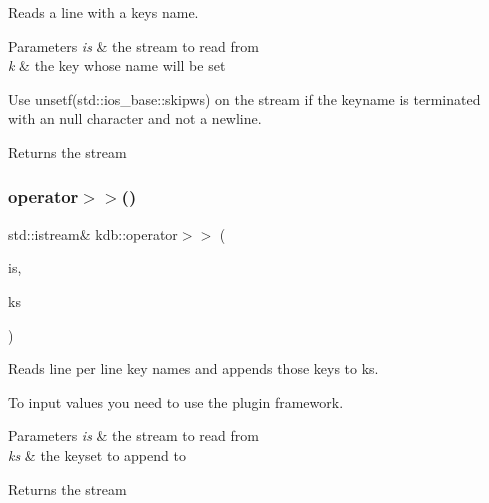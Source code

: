 Reads a line with a keys name. 


\begin{DoxyParams}{Parameters}
{\em is} & the stream to read from \\
\hline
{\em k} & the key whose name will be set\\
\hline
\end{DoxyParams}
Use unsetf(std\+::ios\+\_\+base\+::skipws) on the stream if the keyname is terminated with an null character and not a newline.

\begin{DoxyReturn}{Returns}
the stream 
\end{DoxyReturn}
\mbox{\label{namespacekdb_ac4479a9f39ed65ffd251161bcaf8ea89}} 
\subsubsection{\texorpdfstring{operator$>$$>$()}{operator>>()}\hspace{0.1cm}{\footnotesize\ttfamily [2/2]}}
{\footnotesize\ttfamily std\+::istream\& kdb\+::operator$>$$>$ (\begin{DoxyParamCaption}\item[{std\+::istream \&}]{is,  }\item[{\hyperlink{classkdb_1_1KeySet}{kdb\+::\+Key\+Set} \&}]{ks }\end{DoxyParamCaption})\hspace{0.3cm}{\ttfamily [inline]}}



Reads line per line key names and appends those keys to ks. 

To input values you need to use the plugin framework.


\begin{DoxyParams}{Parameters}
{\em is} & the stream to read from \\
\hline
{\em ks} & the keyset to append to\\
\hline
\end{DoxyParams}
\begin{DoxyReturn}{Returns}
the stream 
\end{DoxyReturn}
